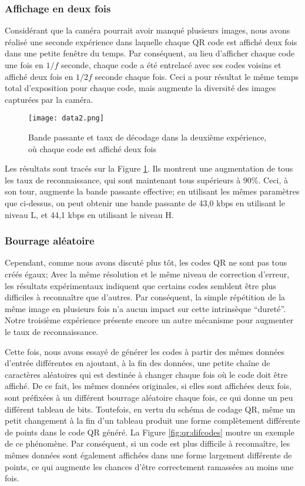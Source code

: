 \subsubsection{Affichage en deux fois}

Considérant que la caméra pourrait avoir manqué plusieurs images, nous avons réalisé une seconde expérience dans laquelle chaque QR code est affiché deux fois dans une petite fenêtre du temps. Par conséquent, au lieu d'afficher chaque code une fois en $1/f$ seconde, chaque code a été entrelacé avec ses codes voisins et affiché deux fois en $1/2f$ seconde chaque fois. Ceci a pour résultat le même temps total d'exposition pour chaque code, mais augmente la diversité des images capturées par la caméra.

\begin{figure}[ht]
\begin{center}
\centering
\texttt{[image: data2.png]}
\caption{Bande passante et taux de décodage dans la deuxième expérience, où chaque code est affiché deux fois}
\label{img-exp2}
\end{center}
\end{figure}

Les résultats sont tracés sur la Figure \ref{img-exp2}. Ils montrent une augmentation de tous les taux de reconnaissance, qui sont maintenant tous supérieurs à 90\%. Ceci, à son tour, augmente la bande passante effective; en utilisant les mêmes paramètres que ci-dessus, on peut obtenir une bande passante de 43,0 kbps en utilisant le niveau L, et 44,1 kbps en utilisant le niveau H.

\subsubsection{Bourrage aléatoire}

Cependant, comme nous avons discuté plus tôt, les codes QR ne sont pas tous créés égaux; Avec la même résolution et le même niveau de correction d'erreur, les résultats expérimentaux indiquent que certains codes semblent être plus difficiles à reconnaître que d'autres. Par conséquent, la simple répétition de la même image en plusieurs fois n'a aucun impact sur cette intrinsèque ``dureté''. Notre troisième expérience présente encore un autre mécanisme pour augmenter le taux de reconnaissance.

Cette fois, nous avons essayé de générer les codes à partir des mêmes données d'entrée différentes en ajoutant, à la fin des données, une petite chaîne de caractères aléatoires qui est destinée à changer chaque fois où le code doit être affiché. De ce fait, les mêmes données originales, si elles sont affichées deux fois, sont préfixées à un différent bourrage aléatoire chaque fois, ce qui donne un peu différent tableau de bits. Toutefois, en vertu du schéma de codage QR, même un petit changement à la fin d'un tableau produit une forme complètement différente de points dans le code QR généré. La Figure \ref{fig:qr:difcodes} montre un exemple de ce phénomène. Par conséquent, si un code est plus difficile à reconnaître, les mêmes données sont également affichées dans une forme largement différente de points, ce qui augmente les chances d'être correctement ramassées au moins une fois.

